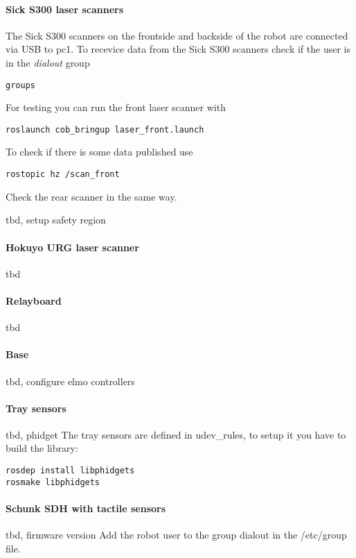 \paragraph{Sick S300 laser scanners}
The Sick S300 scanners on the frontside and backside of the robot are connected via USB to pc1. To recevice data from the Sick S300 scanners check if the user is in the \textit{dialout} group
\begin{lstlisting}
groups
\end{lstlisting}

For testing you can run the front laser scanner with
\begin{lstlisting}
roslaunch cob_bringup laser_front.launch
\end{lstlisting}

To check if there is some data published use
\begin{lstlisting}
rostopic hz /scan_front
\end{lstlisting}

Check the rear scanner in the same way.

tbd, setup safety region

\paragraph{Hokuyo URG laser scanner}
tbd

\paragraph{Relayboard}
tbd

\paragraph{Base}
tbd, configure elmo controllers

\paragraph{Tray sensors} tbd, phidget
The tray sensors are defined in udev\_rules, to setup it you have to build the library:
\begin{lstlisting}
rosdep install libphidgets
rosmake libphidgets
\end{lstlisting}

\paragraph{Schunk SDH with tactile sensors}
tbd, firmware version
Add the robot user to the group dialout in the /etc/group file.

